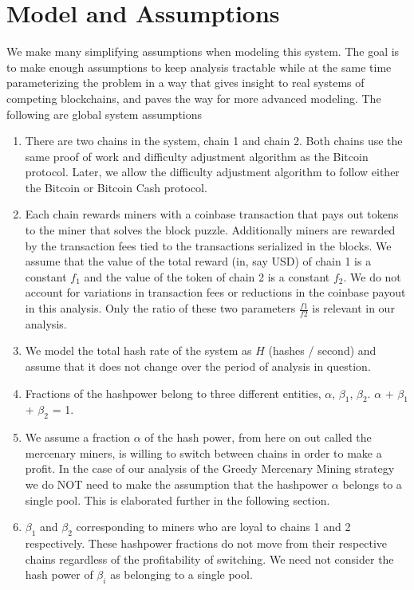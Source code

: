 \documentclass[10pt, preprint]{aastex}
\begin{document}
\section{Model and Assumptions}
We make many simplifying assumptions when modeling this system.  The goal is to make enough assumptions to keep analysis tractable while at the same time parameterizing the problem in a way that gives insight to real systems of competing blockchains, and paves the way for more advanced modeling.  The following are global system assumptions 
\begin{enumerate}
\item
There are two chains in the system, chain 1 and chain 2.  Both chains use the same proof of work and difficulty adjustment algorithm as the Bitcoin protocol. Later, we allow the difficulty adjustment algorithm to follow either the Bitcoin or Bitcoin Cash protocol.
\item
Each chain rewards miners with a coinbase transaction that pays out tokens to the miner that solves the block puzzle.  Additionally miners are rewarded by the transaction fees tied to the transactions serialized in the blocks.  We assume that the value of the total reward (in, say USD) of chain 1 is a constant $f_1$ and the value of the token of chain 2 is a constant $f_2$.  We do not account for variations in transaction fees or reductions in the coinbase payout in this analysis.  Only the ratio of these two parameters $\frac{f1}{f2}$ is relevant in our analysis.
\item
We model the total hash rate of the system as $H$ (hashes / second) and assume that it does not change over the period of analysis in question.  
\item
Fractions of the hashpower belong to three different entities, $\alpha$, $\beta_1$, $\beta_2$.  $\alpha$ + $\beta_1$ + $\beta_2$ = 1.
\item
We assume a fraction $\alpha$ of the hash power, from here on out called the mercenary miners, is willing to switch between chains in order to make a profit.  In the case of our analysis of the Greedy Mercenary Mining strategy we do NOT need to make the assumption that the hashpower $\alpha$ belongs to a single pool.  This is elaborated further in the following section.
\item
$\beta_1$ and $\beta_2$ corresponding to miners who are loyal to chains 1 and 2 respectively.  These hashpower fractions do not move from their respective chains regardless of the profitability of switching.  We need not consider the hash power of $\beta_i$ as belonging to a single pool.

\end{enumerate}
\end{document}
